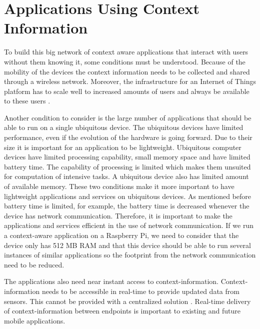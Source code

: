 \section{Applications Using Context Information}
To build this big network of context aware applications that interact with users without them knowing it, some conditions must be understood. Because of the mobility of the devices the context information needs to be collected and shared through a wireless network. Moreover, the infrastructure for an Internet of Things platform has to scale well to increased amounts of users and always be available to these users \cite{Kanter539187}.

Another condition to consider is the large number of applications that should be able to run on a single ubiquitous device. The ubiquitous devices have limited performance, even if the evolution of the hardware is going forward. Due to their size it is important for an application to be lightweight. Ubiquitous computer devices have limited processing capability, small memory space and have limited battery time. The capability of processing is limited which makes them unsuited for computation of intensive tasks. A ubiquitous device also has limited amount of available memory. These two conditions make it more important to have lightweight applications and services on ubiquitous devices. As mentioned before battery time is limited, for example, the battery time is decreased whenever the device has network communication. Therefore, it is important to make the applications and services efficient in the use of network communication. 
If we run a context-aware application on a Raspberry Pi, we need to consider that the device only has 512 MB RAM and that this device should be able to run several instances of similar applications so the footprint from the network communication need to be reduced. 

The applications also need near instant access to context-information. Context-information needs to be accessible in real-time to provide updated data from sensors. This cannot be provided with a centralized solution \cite{TheMediaSenseFramework}. Real-time delivery of context-information between endpoints is important to existing and future mobile applications. 
